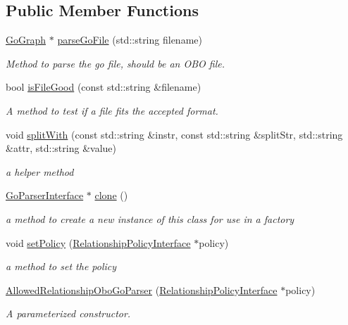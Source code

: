 \subsection*{Public Member Functions}
\begin{DoxyCompactItemize}
\item 
\hyperlink{classGoGraph}{Go\+Graph} $\ast$ \hyperlink{classAllowedRelationshipOboGoParser_a6eb0ab84216c386a2595aa47233448ad}{parse\+Go\+File} (std\+::string filename)
\begin{DoxyCompactList}\small\item\em Method to parse the go file, should be an O\+BO file. \end{DoxyCompactList}\item 
bool \hyperlink{classAllowedRelationshipOboGoParser_a67722c03da0ca2e0f9eb4008dddc6e06}{is\+File\+Good} (const std\+::string \&filename)
\begin{DoxyCompactList}\small\item\em A method to test if a file fits the accepted format. \end{DoxyCompactList}\item 
void \hyperlink{classAllowedRelationshipOboGoParser_a675bd9d5e302fe77b96e16ef647e53d1}{split\+With} (const std\+::string \&instr, const std\+::string \&split\+Str, std\+::string \&attr, std\+::string \&value)
\begin{DoxyCompactList}\small\item\em a helper method \end{DoxyCompactList}\item 
\hyperlink{classGoParserInterface}{Go\+Parser\+Interface} $\ast$ \hyperlink{classAllowedRelationshipOboGoParser_add9a434ad4acd785b51550dc5fd9388b}{clone} ()
\begin{DoxyCompactList}\small\item\em a method to create a new instance of this class for use in a factory \end{DoxyCompactList}\item 
void \hyperlink{classAllowedRelationshipOboGoParser_ab232a6b864dc4350f95da6f281df4491}{set\+Policy} (\hyperlink{classRelationshipPolicyInterface}{Relationship\+Policy\+Interface} $\ast$policy)
\begin{DoxyCompactList}\small\item\em a method to set the policy \end{DoxyCompactList}\item 
\hyperlink{classAllowedRelationshipOboGoParser_ac74305e8723b42f6c6ffd78ff4c9824e}{Allowed\+Relationship\+Obo\+Go\+Parser} (\hyperlink{classRelationshipPolicyInterface}{Relationship\+Policy\+Interface} $\ast$policy)
\begin{DoxyCompactList}\small\item\em A parameterized constructor. \end{DoxyCompactList}\end{DoxyCompactItemize}



